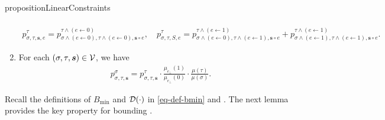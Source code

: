 \documentclass[11pt]{article}
\newcommand{\seqS}{\boldsymbol{s}}
\newcommand{\hktodo}[1]{{\color{blue}{#1}}}
\begin{document}
\begin{restatable}{proposition}{LinearConstraints}
\begin{enumerate}[(1)]
\begin{align}
            \end{align}
            \begin{align}\label{eqn-inner-child-sum4}
                p^{\tau}_{\sigma,\tau, \seqS,e}=p^{\tau\land (e\gets 0)}_{\sigma\land (e\gets 0),\tau\land (e\gets 0), \seqS\circ e}, \quad  p^{\tau}_{\sigma,\tau,S,e}=p^{\tau\land (e\gets 1)}_{\sigma\land (e\gets 0),\tau\land (e\gets 1), \seqS \circ e} + p^{\tau \land (e\gets 1)}_{\sigma\land (e\gets 1),\tau\land (e\gets 1), \seqS\circ e}.
            \end{align}
            \item For each $(\sigma, \tau, \seqS) \in \+V$, we have
            \begin{align}\label{eqn-ratio}
            	{p^{\sigma}_{\sigma,\tau, \seqS}} = p^{\tau}_{\sigma,\tau, \seqS} \cdot \frac{\mu_{e_{\bot}}(1)}{\mu_{e_{\bot}}(0)}\cdot \frac{ \mu(\tau)}{ \mu(\sigma)}.
            \end{align}
        \end{enumerate}
    \end{restatable}
    
    Recall the definitions of $B_{\min}$ and $\mathcal{D}(\cdot)$ in \eqref{eq-def-bmin} and . The next lemma provides the key property for bounding \hktodo{the coupling error}.
\end{document}
